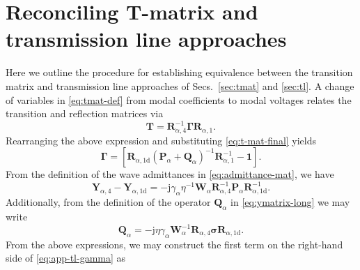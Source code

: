 \documentclass[article]{IEEEtran}
\newcommand{\M}[1]{\mathbf{#1}}
\newcommand{\T}[1]{\mathrm{#1}}
\newcommand{\Xopchar}{P}
\newcommand{\Yopchar}{Q}
\newcommand{\Xmat}{\mathbf{\Xopchar}}
\newcommand{\Ymat}{\mathbf{\Yopchar}}
\begin{document}
\section{Reconciling T-matrix and transmission line approaches}
\label{sec:app-tl-and-tmat}
Here we outline the procedure for establishing equivalence between the transition matrix and transmission line approaches of Secs.~\ref{sec:tmat} and \ref{sec:tl}. 
A change of variables in \eqref{eq:tmat-def} from modal coefficients to modal voltages relates the transition and reflection matrices via
\begin{equation}
    \M{T} = \M{R}_{\alpha,4}^{-1}\boldsymbol{\Gamma}\M{R}_{\alpha,1}.
\end{equation}
Rearranging the above expression and substituting \eqref{eq:t-mat-final} yields
\begin{equation}
    \M{\Gamma} %
    = \left[\M{R}_{\alpha,1\T{d}}\left(\Xmat_\alpha+\Ymat_\alpha\right)^{-1}\M{R}_{\alpha,1}^{-1}-\M{1}\right].
    \label{eq:app-tl-gamma}
\end{equation}
From the definition of the wave admittances in \eqref{eq:admittance-mat}, we have
\begin{equation}
    \M{Y}_{\alpha,4} - \M{Y}_{\alpha,1\T{d}} = -\T{j}\gamma_\alpha \eta^{-1}\M{W}_\alpha\M{R}_{\alpha,4}^{-1}\Xmat_\alpha\M{R}_{\alpha,1\T{d}}^{-1}.
\end{equation}
Additionally, from the definition of the operator $\Ymat_\alpha$ in \eqref{eq:ymatrix-long} we may write
\begin{equation}
    \Ymat_\alpha = -\T{j}\eta \gamma_\alpha\M{W}_\alpha^{-1}\M{R}_{\alpha,4}\boldsymbol{\sigma}\M{R}_{\alpha,1\T{d}}.
\end{equation}
From the above expressions, we may construct the first term on the right-hand side of \eqref{eq:app-tl-gamma} as
\end{document}
